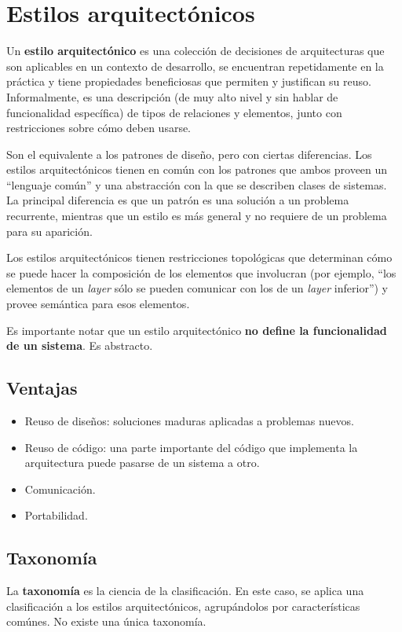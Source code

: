 \documentclass[]{article}
\begin{document}
\section{Estilos arquitectónicos}
Un \textbf{estilo arquitectónico} es una colección de decisiones de arquitecturas que son aplicables en un contexto de desarrollo, se encuentran repetidamente en la práctica y tiene propiedades beneficiosas que permiten y justifican su reuso. Informalmente, es una descripción (de muy alto nivel y sin hablar de funcionalidad específica) de tipos de relaciones y elementos, junto con restricciones sobre cómo deben usarse.

Son el equivalente a los patrones de diseño, pero con ciertas diferencias. Los estilos arquitectónicos tienen en común con los patrones que ambos proveen un ``lenguaje común'' y una abstracción con la que se describen clases de sistemas. La principal diferencia es que un patrón es una solución a un problema recurrente, mientras que un estilo es más general y no requiere de un problema para su aparición.


Los estilos arquitectónicos tienen restricciones topológicas que determinan cómo se puede hacer la composición de los elementos que involucran (por ejemplo, ``los elementos de un \emph{layer} sólo se pueden comunicar con los de un \emph{layer} inferior'') y provee semántica para esos elementos.

Es importante notar que un estilo arquitectónico \textbf{no define la funcionalidad de un sistema}. Es abstracto.

\subsection{Ventajas}
\begin{itemize}
	\item Reuso de diseños: soluciones maduras aplicadas a problemas nuevos.
	\item Reuso de código: una parte importante del código que implementa la arquitectura puede pasarse de un sistema a otro.
	\item Comunicación.
	\item Portabilidad.
\end{itemize}

\subsection{Taxonomía}
La \textbf{taxonomía} es la ciencia de la clasificación. En este caso, se aplica una clasificación a los estilos arquitectónicos, agrupándolos por características comúnes. No existe una única taxonomía.
\end{document}
